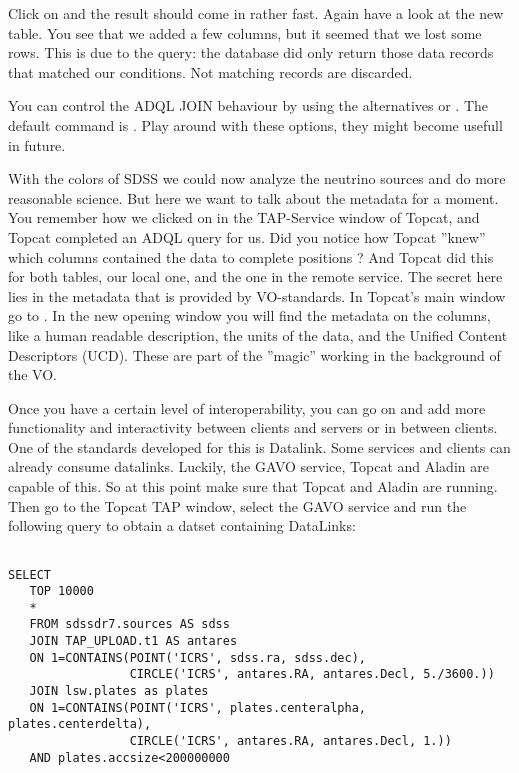 \documentclass[twoside]{article}[12pt]
\begin{document}
Click on  and the result should come in rather fast.
Again have a look at the new table. You see that we added a few columns,
but it seemed that we lost some rows. This is due to the query: the
database did only return those data records that matched our conditions.
Not matching records are discarded.
\ADQLSTD  

\begin{exercise}
You can control the ADQL JOIN behaviour by using the alternatives
 or . The
default command is . Play around with these options,
they might become usefull in future. 
\end{exercise}

With the colors of SDSS we could now analyze the neutrino sources and do
more reasonable science. But here we want to talk about the metadata for
a moment. You remember how we clicked on  in the
TAP-Service window of Topcat, and Topcat completed an ADQL query for us.
Did you notice how Topcat ''knew'' which columns contained the data to
complete positions ? And Topcat did this for both tables, our local one,
and the one in the remote service. The secret here lies in the metadata
that is provided by VO-standards. 
In Topcat's main window go to \goto {}. In
the new opening window you will find the metadata on the columns, like a
human readable description, the units of the data, and the Unified
Content Descriptors (UCD). These are part of the ''magic'' working in the
background of the VO. 

\UCD



Once you have a certain level of interoperability, you can go on and add
more functionality and interactivity between clients and servers or in
between clients. One of the standards developed for this is Datalink. Some
services and clients can already consume datalinks. Luckily, the GAVO
service, Topcat and Aladin are capable of this. So at this point make
sure that Topcat and Aladin are running. Then go to the Topcat TAP
window, select the GAVO service and run the following query to obtain a
datset containing DataLinks:


\begin{lstlisting}

SELECT
   TOP 10000
   *
   FROM sdssdr7.sources AS sdss
   JOIN TAP_UPLOAD.t1 AS antares
   ON 1=CONTAINS(POINT('ICRS', sdss.ra, sdss.dec),
                 CIRCLE('ICRS', antares.RA, antares.Decl, 5./3600.))
   JOIN lsw.plates as plates
   ON 1=CONTAINS(POINT('ICRS', plates.centeralpha, plates.centerdelta),
                 CIRCLE('ICRS', antares.RA, antares.Decl, 1.))
   AND plates.accsize<200000000

\end{lstlisting}
\end{document}
